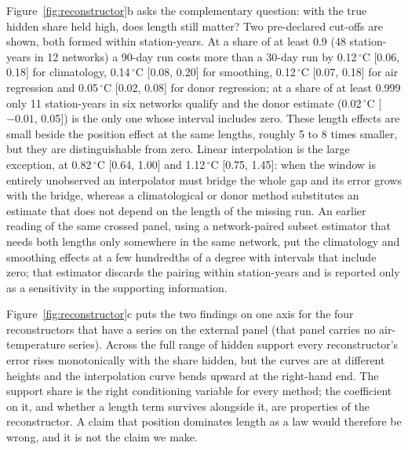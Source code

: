\documentclass[draft]{agujournal2025}
\begin{document}
Figure~\ref{fig:reconstructor}b asks the complementary question: with the true
hidden share held high, does length still matter? Two pre-declared cut-offs are
shown, both formed within station-years. At a share of at least 0.9
(48 station-years in 12 networks) a 90-day run costs more than a 30-day run by
0.12\,$^{\circ}$C [0.06, 0.18] for climatology, 0.14\,$^{\circ}$C [0.08, 0.20]
for smoothing, 0.12\,$^{\circ}$C [0.07, 0.18] for air regression and
0.05\,$^{\circ}$C [0.02, 0.08] for donor regression; at a share of at least 0.999
only 11 station-years in six networks qualify and the donor estimate
(0.02\,$^{\circ}$C [$-0.01$, 0.05]) is the only one whose interval includes zero. These length effects are small beside the
position effect at the same lengths, roughly 5 to 8 times smaller, but they are
distinguishable from zero. Linear interpolation is the large exception, at
0.82\,$^{\circ}$C [0.64, 1.00] and 1.12\,$^{\circ}$C [0.75, 1.45]: when the
window is entirely unobserved an interpolator must bridge the whole gap and its
error grows with the bridge, whereas a climatological or donor method substitutes
an estimate that does not depend on the length of the missing run. An earlier
reading of the same crossed panel, using a network-paired subset estimator that
needs both lengths only somewhere in the same network, put the climatology and
smoothing effects at a few hundredths of a degree with intervals that include
zero; that estimator discards the pairing within station-years and is reported
only as a sensitivity in the supporting information.

Figure~\ref{fig:reconstructor}c puts the two findings on one axis for the four
reconstructors that have a series on the external panel (that panel carries no
air-temperature series). Across the full range of hidden support every
reconstructor's error rises monotonically with the share hidden, but the curves
are at different heights and the interpolation curve bends upward at the
right-hand end. The support share is the right conditioning variable for every
method; the coefficient on it, and whether a length term survives alongside it,
are properties of the reconstructor. A claim that position dominates length as a
law would therefore be wrong, and it is not the claim we make.
\end{document}
